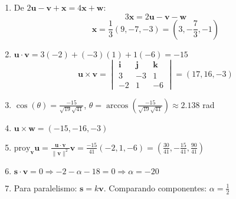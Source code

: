 \begin{prob}
\begin{myproof}
\begin{enumerate}[$(a)$]
\item De $2\mathbf{u} - \mathbf{v} + \mathbf{x} = 4\mathbf{x} + \mathbf{w}$:
$$3\mathbf{x} = 2\mathbf{u} - \mathbf{v} - \mathbf{w}$$
$$\mathbf{x} = \frac{1}{3}(9,-7,-3) = \left(3, -\frac{7}{3}, -1\right)$$

\item $\mathbf{u} \cdot \mathbf{v} = 3(-2) + (-3)(1) + 1(-6) = -15$
$$\mathbf{u} \times \mathbf{v} = \begin{vmatrix}
\mathbf{i} & \mathbf{j} & \mathbf{k} \\
3 & -3 & 1 \\
-2 & 1 & -6
\end{vmatrix} = (17,16,-3)$$

\item $\cos(\theta) = \frac{-15}{\sqrt{19}\sqrt{41}}$, $\theta = \arccos\left(\frac{-15}{\sqrt{19}\sqrt{41}}\right) \approx 2.138$ rad

\item $\mathbf{u} \times \mathbf{w} = (-15,-16,-3)$

\item $\text{proy}_{\mathbf{v}}\mathbf{u} = \frac{\mathbf{u} \cdot \mathbf{v}}{\|\mathbf{v}\|^2}\mathbf{v} = \frac{-15}{41}(-2,1,-6) = \left(\frac{30}{41}, -\frac{15}{41}, \frac{90}{41}\right)$

\item $\mathbf{s} \cdot \mathbf{v} = 0 \Rightarrow -2 - \alpha - 18 = 0 \Rightarrow \alpha = -20$

\item Para paralelismo: $\mathbf{s} = k\mathbf{v}$. Comparando componentes: $\alpha = \frac{1}{2}$
\end{enumerate}
\end{myproof}
\end{prob}



